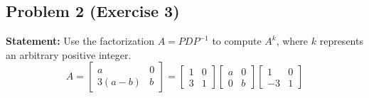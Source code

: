 \documentclass[11pt, a4paper]{article}
\theoremstyle{definition}
\theoremstyle{remark}
\begin{document}
\subsection{Problem 2 (Exercise 3)}
\textbf{Statement:} Use the factorization $A = PDP^{-1}$ to compute $A^k$, where $k$ represents an arbitrary positive integer.
\[
A = \begin{bmatrix} a & 0 \\ 3(a-b) & b \end{bmatrix} = \begin{bmatrix} 1 & 0 \\ 3 & 1 \end{bmatrix} \begin{bmatrix} a & 0 \\ 0 & b \end{bmatrix} \begin{bmatrix} 1 & 0 \\ -3 & 1 \end{bmatrix}
\]
\end{document}
